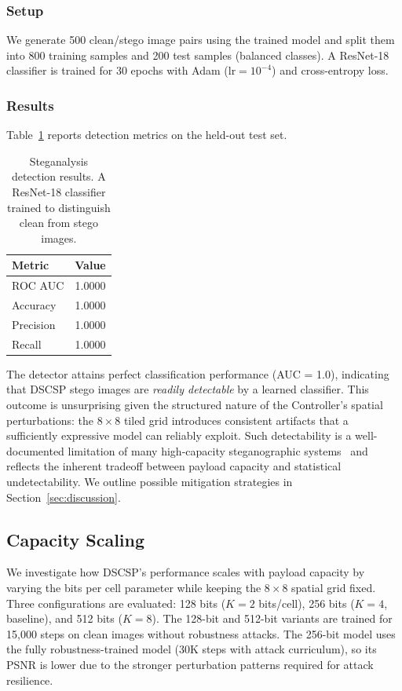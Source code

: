 \documentclass[conference]{IEEEtran}
\begin{document}
\subsubsection{Setup}
We generate 500 clean/stego image pairs using the trained model and split them into 800 training samples and 200 test samples (balanced classes).
A ResNet-18~\cite{he2016deep} classifier is trained for 30 epochs with Adam ($\text{lr} = 10^{-4}$) and cross-entropy loss.

\subsubsection{Results}
Table~\ref{tab:steganalysis} reports detection metrics on the held-out test set.

\begin{table}[t]
\centering
\caption{Steganalysis detection results. A ResNet-18 classifier trained to distinguish clean from stego images.}
\label{tab:steganalysis}
\begin{tabular}{@{}lc@{}}
\toprule
\textbf{Metric} & \textbf{Value} \\
\midrule
ROC AUC    & 1.0000 \\
Accuracy   & 1.0000 \\
Precision  & 1.0000 \\
Recall     & 1.0000 \\
\bottomrule
\end{tabular}
\end{table}

The detector attains perfect classification performance (AUC = 1.0), indicating that DSCSP stego images are \emph{readily detectable} by a learned classifier.
This outcome is unsurprising given the structured nature of the Controller’s spatial perturbations: the $8 \times 8$ tiled grid introduces consistent artifacts that a sufficiently expressive model can reliably exploit.
Such detectability is a well-documented limitation of many high-capacity steganographic systems~\cite{boroumand2019deep} and reflects the inherent tradeoff between payload capacity and statistical undetectability.
We outline possible mitigation strategies in Section~\ref{sec:discussion}.


\subsection{Capacity Scaling}
\label{sec:scaling}

We investigate how DSCSP's performance scales with payload capacity by varying the bits per cell parameter while keeping the $8 \times 8$ spatial grid fixed.
Three configurations are evaluated: 128 bits ($K=2$ bits/cell), 256 bits ($K=4$, baseline), and 512 bits ($K=8$).
The 128-bit and 512-bit variants are trained for 15{,}000 steps on clean images without robustness attacks.
The 256-bit model uses the fully robustness-trained model (30K steps with attack curriculum), so its PSNR is lower due to the stronger perturbation patterns required for attack resilience.
\end{document}
